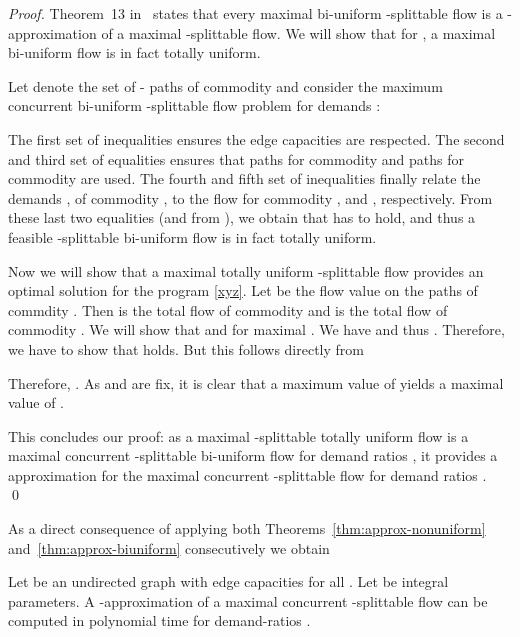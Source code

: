 \begin{proof}
  Theorem~13 in~\cite{baier-koehler-skutella:05} states that every
  maximal bi-uniform -splittable flow is a
  -approximation of a maximal -splittable
  flow. We will show that for , a maximal
  bi-uniform flow is in fact totally uniform.

  Let  denote the set of - paths of commodity 
   and consider the maximum concurrent bi-uniform 
  -splittable flow problem for demands :
 

The first set of inequalities ensures the edge capacities are
respected. The second and third set of equalities ensures that 
paths for commodity  and  paths for commodity  are
used. The fourth and fifth set of inequalities finally relate the
demands , of commodity , to the flow for commodity
,  and , respectively. From these last two
equalities (and from ), we obtain that  has 
to hold, and thus a feasible -splittable bi-uniform flow is 
in fact totally uniform. 

Now we will show that a maximal totally uniform -splittable
flow provides an optimal solution for the program \eqref{xyz}. Let
 be the flow value on the  paths of commdity . Then 
 is the total flow of commodity  and 
 is the total flow of commodity . We will 
show that  and 
for maximal .
We have 
and thus . Therefore, we
have to show that 
holds. But this follows directly from  

Therefore, .
As  and  are fix, it is clear that a maximum value
of  yields a maximal value of .

This concludes our proof: as a maximal -splittable totally 
uniform flow is a maximal concurrent 
-splittable bi-uniform flow for demand ratios , 
it provides a  approximation for the maximal concurrent 
-splittable flow for demand ratios .
\qed \end{proof}

As a direct consequence of applying both
Theorems~\ref{thm:approx-nonuniform} and~\ref{thm:approx-biuniform}
consecutively we obtain

\begin{corollary}
  Let  be an undirected graph with edge capacities
   for all . Let  be
  integral parameters. A -approximation of a maximal 
  concurrent -splittable flow can be computed in polynomial
  time for demand-ratios .
\end{corollary}






